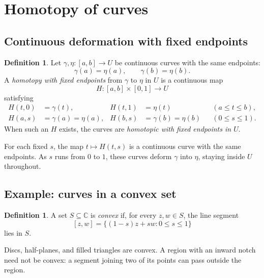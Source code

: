 \documentclass[11pt]{article}
\theoremstyle{plain}
\theoremstyle{definition}
\newtheorem{definition}[theorem]{Definition}
\theoremstyle{remark}
\numberwithin{equation}{section}
\newcommand{\C}{\mathbb{C}}
\begin{document}
\section{Homotopy of curves}
\subsection{Continuous deformation with fixed endpoints}
\begin{definition}\label{def:homotopy}
Let $\gamma,\eta\colon[a,b]\to U$ be continuous curves with the same
endpoints:
\[
 \gamma(a)=\eta(a),\qquad \gamma(b)=\eta(b).
\]
A \emph{homotopy with fixed endpoints} from $\gamma$ to $\eta$ in $U$
is a continuous map
\[
 H\colon[a,b]\times[0,1]\longrightarrow U
\]
satisfying
\begin{align*}
 H(t,0)&=\gamma(t),& H(t,1)&=\eta(t)&& (a\leq t\leq b),\\
 H(a,s)&=\gamma(a)=\eta(a),&
 H(b,s)&=\gamma(b)=\eta(b)&& (0\leq s\leq1).
\end{align*}
When such an $H$ exists, the curves are \emph{homotopic with fixed
endpoints in $U$}.
\end{definition}
For each fixed $s$, the map $t\mapsto H(t,s)$ is a continuous curve
with the same endpoints. As $s$ runs from $0$ to $1$, these curves
 deform $\gamma$ into $\eta$, staying inside $U$ throughout.

\begin{center}
\end{center}

\subsection{Example: curves in a convex set}
\begin{definition}
A set $S\subseteq\C$ is \emph{convex} if, for every $z,w\in S$,
the line segment
\[
 [z,w]=\{(1-s)z+sw:0\leq s\leq1\}
\]
lies in $S$.
\end{definition}
Discs, half-planes, and filled triangles are convex. A region with an
inward notch need not be convex: a segment joining two of its points
 can pass outside the region.
\end{document}
